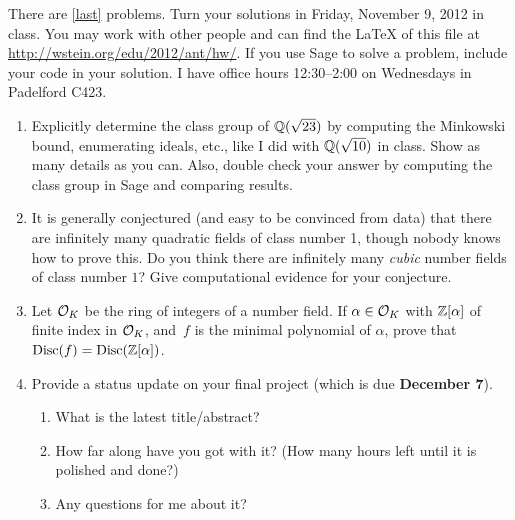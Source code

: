 \documentclass{article}
\title{\dred{Math 581e, Fall 2012, Homework 6}}
\author{William Stein ({\tt wstein@uw.edu})}
\date{Due: Friday, November 9, 2012}
\begin{document}
\maketitle

{\color{dbluecolor}There are \ref{last} problems. Turn your solutions
  in Friday, November 9, 2012 in class.  You may work with other
  people and can find the \LaTeX{} of this file at
  \url{http://wstein.org/edu/2012/ant/hw/}.  If you use Sage to solve
  a problem, include your code in your solution. I have office hours
  12:30--2:00 on Wednesdays in Padelford C423.  }

\begin{enumerate}

\item Explicitly determine the class group of $\mathbb{Q}(\sqrt{23})$ by
  computing the Minkowski bound, enumerating ideals, etc., like I did
  with $\mathbb{Q}(\sqrt{10})$ in class.  Show as many details as you can.
  Also, double check your answer by computing the class group in Sage
  and comparing results.

\item It is generally conjectured (and easy to be convinced from data)
  that there are infinitely many quadratic fields of class number 1,
  though nobody knows how to prove this. Do you think there are
  infinitely many {\em cubic} number fields of class number $1$?  Give
  computational evidence for your conjecture.

\item Let $\mathcal{O}_K$ be the ring of integers of a number field. If
  $\alpha\in \mathcal{O}_K$ with $\mathbb{Z}[\alpha]$ of finite index in $\mathcal{O}_K$,
  and~$f$ is the minimal polynomial of $\alpha$, prove that
  $\operatorname{Disc}(f)=\operatorname{Disc}(\mathbb{Z}[\alpha])$.  

\item \label{last} Provide a status update on your final project
  (which is due {\bf December 7}).
\begin{enumerate}
\item What is the latest title/abstract?
\item How far along have you got with it?  (How many hours left until it is polished and done?)
\item Any questions for me about it?
\end{enumerate}

\end{enumerate}
\end{document}
